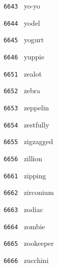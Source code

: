 \documentclass[11pt]{article}
\begin{document}
\begin{multicols}{6}
\noindent \texttt{ 6643 } \hspace{1mm} yo-yo  \par
\noindent \texttt{ 6644 } \hspace{1mm} yodel  \par
\noindent \texttt{ 6645 } \hspace{1mm} yogurt  \par
\noindent \texttt{ 6646 } \hspace{1mm} yuppie  \par
\noindent \texttt{ 6651 } \hspace{1mm} zealot  \par
\noindent \texttt{ 6652 } \hspace{1mm} zebra  \par
\noindent \texttt{ 6653 } \hspace{1mm} zeppelin  \par
\noindent \texttt{ 6654 } \hspace{1mm} zestfully  \par
\noindent \texttt{ 6655 } \hspace{1mm} zigzagged  \par
\noindent \texttt{ 6656 } \hspace{1mm} zillion  \par
\noindent \texttt{ 6661 } \hspace{1mm} zipping  \par
\noindent \texttt{ 6662 } \hspace{1mm} zirconium  \par
\noindent \texttt{ 6663 } \hspace{1mm} zodiac  \par
\noindent \texttt{ 6664 } \hspace{1mm} zombie  \par
\noindent \texttt{ 6665 } \hspace{1mm} zookeeper  \par
\noindent \texttt{ 6666 } \hspace{1mm} zucchini
\end{multicols}
\end{document}
